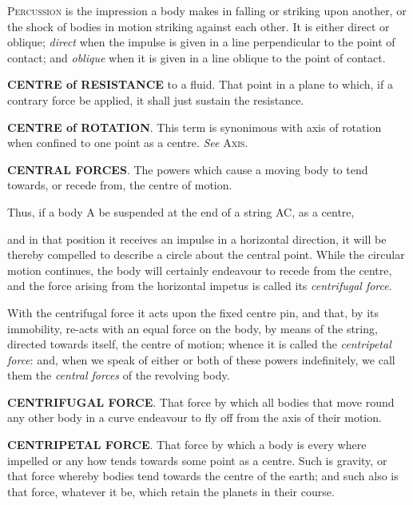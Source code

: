 \textsc{Percussion} is the impression a body makes in falling or striking upon another, or the shock of bodies in motion striking against each other. It is either direct or oblique; \textit{direct }when the impulse is given in a line perpendicular to the point of contact; and \textit{oblique} when it is given in a line oblique to the point of contact. 

\textbf{CENTRE of RESISTANCE} to a fluid. That point in a plane to which, if a contrary force be applied, it shall just sustain the resistance. 

\textbf{CENTRE of ROTATION}. This term is synonimous with axis of rotation when confined to one point as a centre. \textit{See} \textsc{Axis}. 

\textbf{CENTRAL FORCES}. The powers which cause a moving body to tend towards, or recede from, the centre of motion. 

Thus, if a body A be suspended at the end of a string AC, as a centre,
\begin{figure}
\begin{center}
\end{center}
\end{figure} 
and in that position it receives an impulse in a horizontal direction, it will be thereby compelled to describe a circle about the central point. While the circular motion continues, the body will certainly endeavour to recede from the centre, and the force arising from the horizontal impetus is called its \textit{centrifugal force}. 

With the centrifugal force it acts upon the fixed centre pin, and that, by its immobility, re-acts with an equal force on the body, by means of the string, directed towards itself, the centre of motion; whence it is called the \textit{centripetal force}: and, when we speak of either or both of these powers indefinitely, we call them the \textit{central forces} of the revolving body. 

\textbf{CENTRIFUGAL FORCE}. That force by which all bodies that move round any other body in a curve endeavour to fly off from the axis of their motion. 

\textbf{CENTRIPETAL FORCE}. That force by which a body is every where impelled or any how tends towards some point as a centre. Such is gravity, or that force whereby bodies tend towards the centre of the earth; and such also is that force, whatever it be, which retain the planets in their course. 

